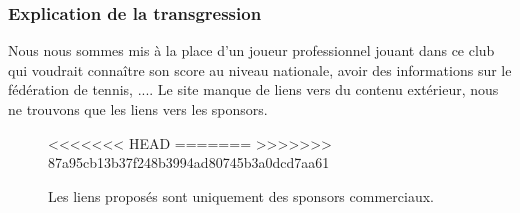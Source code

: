 \documentclass{article}[12pt]
\begin{document}
    \subsubsection*{Explication de la transgression}
    Nous nous sommes mis à la place d'un joueur professionnel jouant dans ce club qui voudrait connaître son score au niveau nationale, avoir des informations sur le fédération de tennis, .... Le site manque de liens vers du contenu extérieur, nous ne trouvons que les liens vers les sponsors.
        \begin{figure}[H]
        	\centering
<<<<<<< HEAD
=======
>>>>>>> 87a95cb13b37f248b3994ad80745b3a0dcd7aa61
        	\caption{Les liens proposés sont uniquement des sponsors commerciaux.}
        \end{figure}
    
\end{document}
